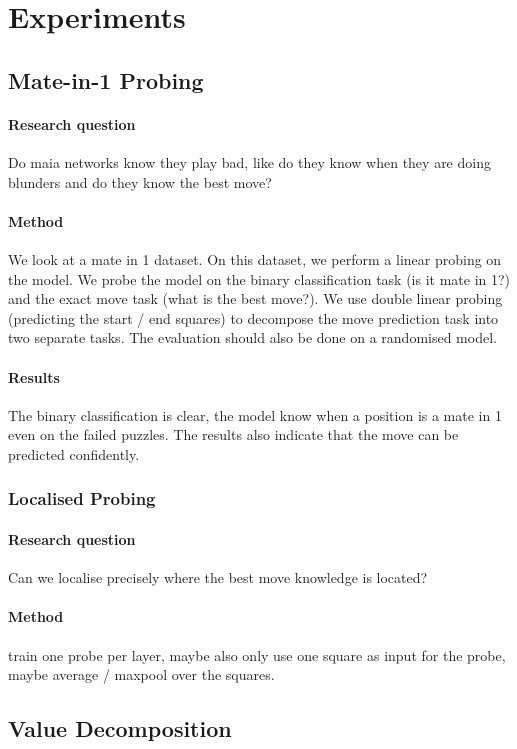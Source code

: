 \section{Experiments}

\subsection{Mate-in-1 Probing}
\paragraph{Research question} Do maia networks know they play bad, like do they know when they are doing blunders and do they know the best move?

\paragraph{Method} We look at a mate in 1 dataset. On this dataset, we perform a linear probing on the model. We probe the model on the binary classification task (is it mate in 1?) and the exact move task (what is the best move?). We use double linear probing (predicting the start / end squares) to decompose the move prediction task into two separate tasks.
The evaluation should also be done on a randomised model.

\paragraph{Results} The binary classification is clear, the model know when a position is a mate in 1 even on the failed puzzles. The results also indicate that the move can be predicted confidently.

\subsubsection{Localised Probing}
\paragraph{Research question}
Can we localise precisely where the best move knowledge is located?
\paragraph{Method}
train one probe per layer, maybe also only use one square as input for the probe, maybe average / maxpool over the squares.

\subsection{Value Decomposition}
